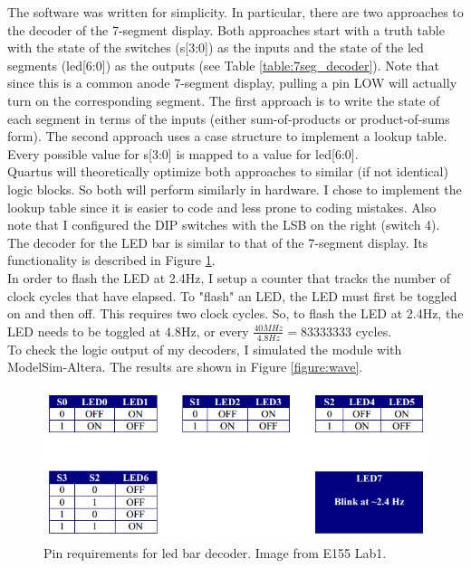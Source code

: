 \documentclass[11pt]{article}
\begin{document}
The software was written for simplicity. In particular, there are two approaches to the decoder of the 7-segment display. Both approaches start with a truth table with the state of the switches (s[3:0]) as the inputs and the state of the led segments (led[6:0]) as the outputs (see Table \ref{table:7seg_decoder}). Note that since this is a common anode 7-segment display, pulling a pin LOW will actually turn on the corresponding segment. The first approach is to write the state of each segment in terms of the inputs (either sum-of-products or product-of-sums form). The second approach uses a case structure to implement a lookup table. Every possible value for s[3:0] is mapped to a value for led[6:0]. \\

Quartus will theoretically optimize both approaches to similar (if not identical) logic blocks. So both will perform similarly in hardware. I chose to implement the lookup table since it is easier to code and less prone to coding mistakes. Also note that I configured the DIP switches with the LSB on the right (switch 4). \\

The decoder for the LED bar is similar to that of the 7-segment display. Its functionality is described in Figure \ref{figure:led_bar_decoder}. \\

In order to flash the LED at 2.4Hz, I setup a counter that tracks the number of clock cycles that have elapsed. To "flash" an LED, the LED must first be toggled on and then off. This requires two clock cycles. So, to flash the LED at 2.4Hz, the LED needs to be toggled at 4.8Hz, or every $\frac{40MHz}{4.8Hz} = 83333333$ cycles. \\

To check the logic output of my decoders, I simulated the module with ModelSim-Altera. The results are shown in Figure \ref{figure:wave}. \\



\begin{figure}[h!]
\centering
\includegraphics[scale=0.7]{led_bar.png}
\caption{Pin requirements for led bar decoder. Image from E155 Lab1.}
\label{figure:led_bar_decoder}
\end{figure} 
\end{document}
